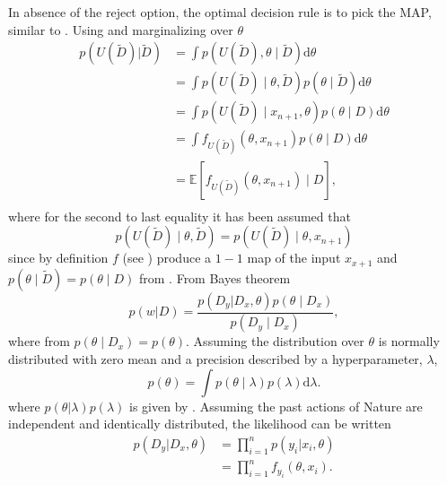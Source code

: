 In absence of the reject option, the optimal decision rule is to pick the MAP, similar to . Using  and marginalizing over $\theta$
\begin{equation}
	\begin{split}
		p(U(\tilde{D})|\tilde{D}) &= \int p(U(\tilde{D}),\theta \mid\tilde{D}) \mathrm{d}\theta \\
		& = \int p(U(\tilde{D})\mid \theta,\tilde{D})  p(\theta \mid\tilde{D})\mathrm{d}\theta \\
		& = \int p(U(\tilde{D})\mid x_{n+1},\theta)  p(\theta\mid D)\mathrm{d}\theta \\
		& = \int f_{U(\tilde{D})}(\theta,x_{n+1})  p(\theta \mid D)\mathrm{d}\theta \\
		& = \mathbb{E}[f_{U(\tilde{D})}(\theta,x_{n+1})\mid D],\\
	\end{split}
	\label{eq:q5}
\end{equation}
where for the second to last equality it has been assumed that
\begin{equation}
	p(U(\tilde{D})\mid \theta,\tilde{D}) = p(U(\tilde{D})\mid \theta,x_{n+1})
\end{equation}
since by definition $f$ (see ) produce a $1-1$ map of the input $x_{x+1}$ and $p(\theta \mid\tilde{D}) = p(\theta \mid D)$ from . From Bayes theorem
\begin{equation}
	p(w|D) =\frac{p(D_y|D_x,\theta)p(\theta\mid D_x)}{p(D_y\mid D_x)},
\end{equation}
where from  $p(\theta\mid D_x) = p(\theta)$. Assuming the distribution over $\theta$ is normally distributed with zero mean and a precision described by a hyperparameter, $\lambda$, 
\begin{equation}
	p(\theta) = \int p(\theta\mid\lambda)p(\lambda) \mathrm{d}\lambda.
\end{equation}
where $p(\theta|\lambda)p(\lambda)$ is given by . Assuming the past actions of Nature are independent and identically distributed, the likelihood can be written~\citep{Fischer1999} 
\begin{equation}
	\begin{split}
		p(D_y|D_x,\theta) &=\prod_{i=1}^{n}p(y_i|x_i,\theta)\\
		&=\prod_{i=1}^{n}f_{y_i}(\theta,x_i).\\
	\end{split}
	\label{lik}
\end{equation}
